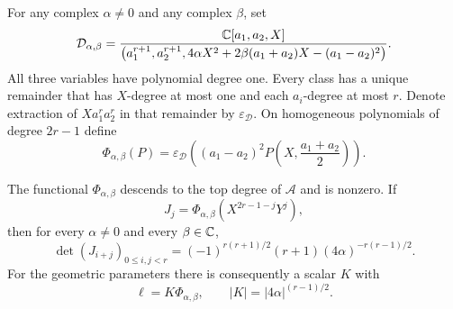 For any complex $\alpha\ne0$ and any complex $\beta$, set
\begin{equation}
 \mathcal D_{\alpha,\beta}=
 \frac{\mathbb C[a_1,a_2,X]}
 {\bigl(a_1^{r+1},a_2^{r+1},
  4\alpha X^2+2\beta(a_1+a_2)X-(a_1-a_2)^2\bigr)}.
 \label{alg:extraction-algebra}
\end{equation}
All three variables have polynomial degree one.  Every class has a
unique remainder that has $X$-degree at most one and each $a_i$-degree
at most $r$.  Denote extraction of $Xa_1^ra_2^r$ in that remainder by
$\varepsilon_{\mathcal D}$.  On homogeneous polynomials of degree
$2r-1$ define
\begin{equation}
 \Phi_{\alpha,\beta}(P)=
 \varepsilon_{\mathcal D}\left(
   (a_1-a_2)^2P\left(X,\frac{a_1+a_2}{2}\right)\right).
 \label{alg:Phi}
\end{equation}

\begin{lemma}
\label{alg:determinant}
The functional $\Phi_{\alpha,\beta}$ descends to the top degree of
$\mathcal A$ and is nonzero.  If
\[
 J_j=\Phi_{\alpha,\beta}(X^{2r-1-j}Y^j),
\]
then for every $\alpha\ne0$ and every $\beta\in\mathbb C$,
\begin{equation}
 \det(J_{i+j})_{0\le i,j<r}
 =(-1)^{r(r+1)/2}(r+1)(4\alpha)^{-r(r-1)/2}.
 \label{alg:determinant-formula}
\end{equation}
For the geometric parameters there is consequently a scalar $K$ with
\begin{equation}
 \ell=K\Phi_{\alpha,\beta},\qquad
 |K|=|4\alpha|^{(r-1)/2}.
 \label{alg:normalization}
\end{equation}
\end{lemma}

